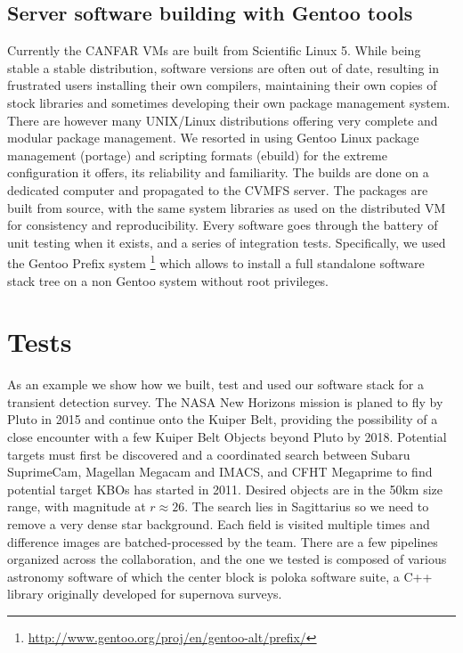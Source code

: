 \subsection{Server software building with Gentoo tools}
Currently the CANFAR VMs are built from
Scientific Linux 5. While being stable a stable distribution, software versions
are often out of date, resulting in frustrated users installing their own
compilers, maintaining their own copies of stock libraries and
sometimes developing their own package management system. There are however many UNIX/Linux distributions offering
very complete and modular package management. We resorted in
using Gentoo Linux package management (portage) and scripting formats
(ebuild) for the extreme configuration it offers, its reliability and
familiarity. The builds are done on a dedicated computer and propagated to the CVMFS
server. The packages are built from source, with the same system libraries as used on the
distributed VM for consistency and reproducibility. Every software
goes through the battery of unit testing when it exists, and a series
of integration tests. Specifically, we used the Gentoo Prefix system \footnote{\url{http://www.gentoo.org/proj/en/gentoo-alt/prefix/}}
which allows to install a full standalone software stack tree on a non
Gentoo system without root privileges.


\section{Tests}

As an example we show how we built, test and used our software stack
for a transient detection survey.
The NASA New Horizons mission is planed to fly by Pluto in 2015 and
continue onto the Kuiper Belt, providing the possibility of a close
encounter with a few Kuiper Belt Objects beyond Pluto by
2018. Potential targets must first be discovered and a coordinated
search between Subaru SuprimeCam, Magellan Megacam and IMACS, and CFHT
Megaprime to find potential target KBOs has started in 2011. Desired objects
are in the 50km size range, with magnitude at $r\approx 26$. The search lies in
Sagittarius so we need to remove a very dense star background. Each
field is visited multiple times and difference images are
batched-processed by the team. There are a few
pipelines organized across the collaboration, and the one we tested is
composed of various astronomy software of which the center block is poloka software suite, a C++
library originally developed for supernova surveys.

